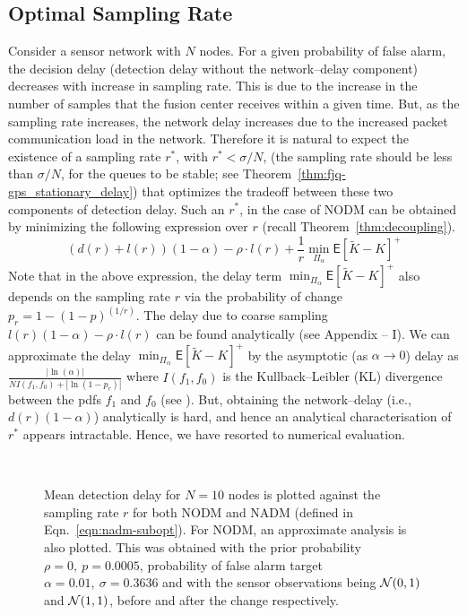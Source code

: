 \documentclass[acmtosn]{acmtrans2m}
\newcommand{\EXP}[1]{\mathsf{E}\!\left[#1\right]}
\begin{document}
\subsection{Optimal Sampling Rate}
\label{sec:optimal_sampling_rate}
Consider a sensor network with $N$ nodes. For a given probability of false alarm, 
the decision delay (detection delay without the network--delay component) 
decreases with increase in sampling rate. This is due to the increase in the 
number of samples that the fusion center receives within a given time. But, as 
the sampling rate increases, the network delay increases due to the increased 
packet communication load in the network. Therefore it is natural to expect the 
existence of a sampling rate $r^*$, with $r^*<\sigma/N$, (the sampling rate should 
be less than $\sigma/N$, for the queues to be stable; see 
Theorem~\ref{thm:fjq-gps_stationary_delay}) that optimizes the tradeoff between 
these two components of detection delay. Such an $r^*$, in the case of {\sf NODM} 
can be obtained by minimizing the following expression over $r$ (recall 
Theorem~\ref{thm:decoupling}).
\[
\left(d(r)+l(r)\right)(1-\alpha) -\rho \cdot l(r) + \frac{1}{r}\min_{\Pi_\alpha} \EXP{\widetilde{K}-K}^+
\]
Note that in the above expression, the delay term $\min_{\Pi_\alpha} 
\EXP{\widetilde{K}-K}^+$ also depends on the sampling rate $r$ via the 
probability of change $p_r = 1 - (1-p)^{(1/r)}$. 
The delay due to coarse sampling $l(r)(1-\alpha) - \rho \cdot l(r)$
can be found analytically (see Appendix -- I). We can approximate the 
delay $\min_{\Pi_\alpha} \EXP{\widetilde{K}-K}^+$ by the asymptotic
(as $\alpha \to 0$) delay as
$\frac{|\ln(\alpha)|}{NI(f_1,f_0)+|\ln(1-p_r)|}$ where $I(f_1,f_0)$
is the Kullback--Leibler (KL) divergence between the pdfs $f_1$ and $f_0$ 
(see \cite{tartakovsky-veeravalli05general-asymptotic-quickest-change}).
But, obtaining the network--delay (i.e., $d(r)(1-\alpha)$) analytically 
is hard, and hence an analytical characterisation of $r^*$ appears 
intractable.  Hence, we have resorted to numerical evaluation. 
\begin{figure}[t]
   \centering \ 
   \caption{Mean detection delay for $N=10$ nodes is plotted against the 
            sampling rate $r$ for both {\sf NODM} and {\sf NADM} (defined 
            in Eqn.~\ref{eqn:nadm-subopt}). For {\sf NODM},
            an approximate analysis is also plotted. This was obtained with the 
            prior probability $\rho=0,~ p=0.0005$, probability of false alarm 
            target $\alpha=0.01,~\sigma=0.3636$ and with the sensor observations
            being ${\cal{N}}(0,1)$ and ${\cal{N}}(1,1)$, before and after the
            change respectively.}
   \label{fig:optimal-sampling-rate}
\end{figure} 
\end{document}
